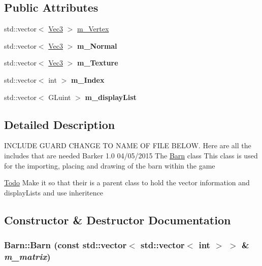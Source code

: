 \subsection*{Public Attributes}
\begin{DoxyCompactItemize}
\item 
std::vector$<$ \hyperlink{classVec3}{Vec3} $>$ \hyperlink{classBarn_adcd72002abf50a7a597dadbc27fd080f}{m\_\-Vertex}
\item 
\hypertarget{classBarn_a1a838d04322bc5b00c73cac4b30c739c}{
std::vector$<$ \hyperlink{classVec3}{Vec3} $>$ {\bfseries m\_\-Normal}}
\label{classBarn_a1a838d04322bc5b00c73cac4b30c739c}

\item 
\hypertarget{classBarn_a55799532bfb8ec9fe5f42f0f134f2b6c}{
std::vector$<$ \hyperlink{classVec3}{Vec3} $>$ {\bfseries m\_\-Texture}}
\label{classBarn_a55799532bfb8ec9fe5f42f0f134f2b6c}

\item 
\hypertarget{classBarn_a31463dcc7123110c513a1cdac9a19328}{
std::vector$<$ int $>$ {\bfseries m\_\-Index}}
\label{classBarn_a31463dcc7123110c513a1cdac9a19328}

\item 
\hypertarget{classBarn_a1511701022406fb3b5463607bebc5060}{
std::vector$<$ GLuint $>$ {\bfseries m\_\-displayList}}
\label{classBarn_a1511701022406fb3b5463607bebc5060}

\end{DoxyCompactItemize}


\subsection{Detailed Description}
INCLUDE GUARD CHANGE TO NAME OF FILE BELOW. Here are all the includes that are needed  Barker  1.0 04/05/2015 The \hyperlink{classBarn}{Barn} class This class is used for the importing, placing and drawing of the barn within the game \begin{Desc}
\item[\hyperlink{todo__todo000003}{Todo}]Make it so that their is a parent class to hold the vector information and displayLists and use inheritence \end{Desc}


\subsection{Constructor \& Destructor Documentation}
\hypertarget{classBarn_a0b6de6424f6b740a356e1ea8c6e24eb9}{
\subsubsection[{Barn}]{\setlength{\rightskip}{0pt plus 5cm}Barn::Barn (const std::vector$<$ std::vector$<$ int $>$ $>$ \& {\em m\_\-matrix})}}
\label{classBarn_a0b6de6424f6b740a356e1ea8c6e24eb9}


